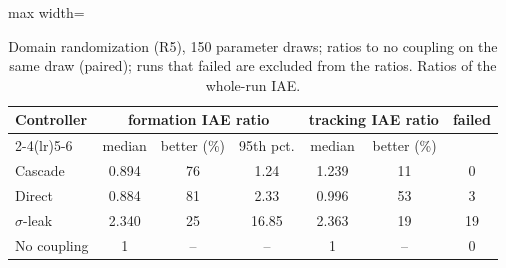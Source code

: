 \begin{table}[!t]\centering\footnotesize
\caption{Domain randomization (R5), 150 parameter draws; ratios to no coupling on the same draw (paired); runs that failed are excluded from the ratios. Ratios of the whole-run IAE.}\label{tab:r5}
\begin{adjustbox}{max width=\columnwidth}
\begin{tabular}{@{}lcccccc@{}}\toprule
Controller & \multicolumn{3}{c}{formation IAE ratio} & \multicolumn{2}{c}{tracking IAE ratio} & failed\\\cmidrule(lr){2-4}\cmidrule(lr){5-6} & median & better (\%) & 95th pct. & median & better (\%) &\\\midrule
Cascade & 0.894 & 76 & 1.24 & 1.239 & 11 & 0\\
Direct & 0.884 & 81 & 2.33 & 0.996 & 53 & 3\\
$\sigma$-leak & 2.340 & 25 & 16.85 & 2.363 & 19 & 19\\
No coupling & 1 & -- & -- & 1 & -- & 0\\
\bottomrule\end{tabular}
\end{adjustbox}
\end{table}
